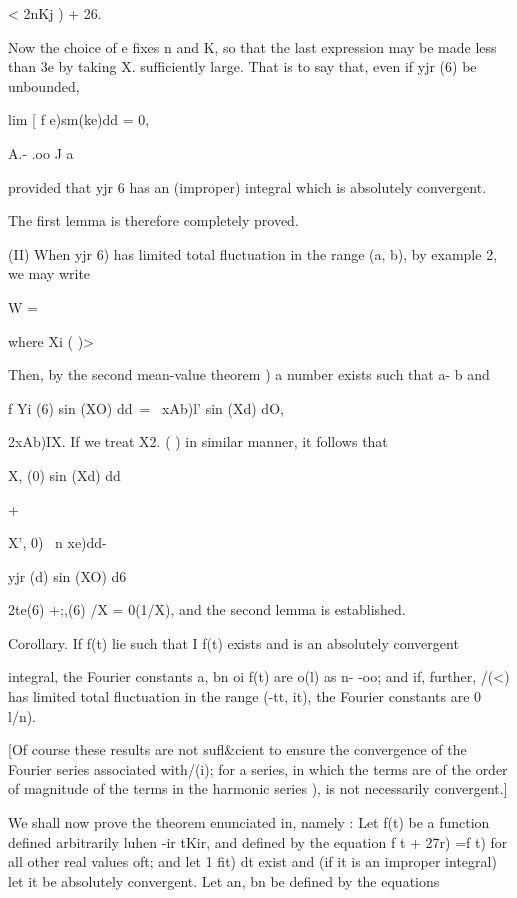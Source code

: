 < 2nKj ) + 26.

Now the choice of e fixes n and K, so that the last expression may be
made less than 3e by taking X. sufficiently large. That is to say
that, even if yjr (6) be unbounded,

lim [ f e)sm(ke)dd = 0,

A.- .oo J a

provided that yjr 6 has an (improper) integral which is absolutely
convergent.

The first lemma is therefore completely proved.

(II) When yjr 6) has limited total fluctuation in the range (a, b), by example 2, we may write

 W = %

where Xi ( )> %

Then, by the second mean-value theorem ) a number exists such
that a- b and

f Yi (6) sin (XO) dd\ = \ xAb)l' sin (Xd) dO,

 2xAb)IX. If we treat X2. ( ) in similar manner, it follows that

X, (0) sin (Xd) dd

+

X', 0) \ n xe)dd-

yjr (d) sin (XO) d6

 2te(6) +;,(6) /X = 0(1/X), and the second lemma is established.

Corollary. If f(t) lie such that I f(t) exists and is an absolutely
convergent

integral, the Fourier constants a, bn oi f(t) are o(l) as n- -oo;
and if, further, /(<) has limited total fluctuation in the range (-tt,
it), the Fourier constants are 0 l/n).

[Of course these results are not sufl\&cient to ensure the convergence
of the Fourier series associated with/(i); for a series, in which the
terms are of the order of magnitude of the terms in the harmonic
series ), is not necessarily convergent.]

%
%


We shall now prove the theorem enunciated in, namely : Let f(t)
be a function defined arbitrarily luhen -ir tKir, and defined by the
equation f t + 27r) =f t) for all other real values oft; and let 1
fit) dt exist and (if it is an improper integral) let it be absolutely
convergent. Let an, bn be defined by the equations

